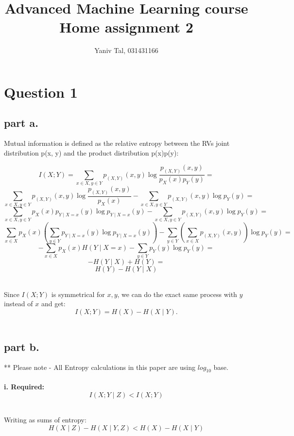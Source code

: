 \documentclass{article}
\title{{Advanced Machine Learning course}\break
{Home assignment 2}}
\author{Yaniv Tal, 031431166}
\begin{document}
\maketitle

\section{Question 1}
    \subsection {part a.}
        Mutual information is defined as the relative entropy between the RVs joint distribution p(x, y) and the product distribution p(x)p(y):
        
        \[ I(X;Y) = \sum_{x\in X,y\in {Y}}p_{(X,Y)}(x,y) \log {\frac {p_{(X,Y)}(x,y)}{p_{X}(x)p_{Y}(y)}} = \]
        \[ \sum_{x\in X, y\in Y} p_{(X,Y)}(x,y) \log {\frac {p_{(X,Y)}(x,y)}{p_{X}(x)}} - \sum _{x\in { {X}},y\in { Y}}p_{(X,Y)}(x,y)\log p_{Y}(y) = \]
        \[ \sum _{x\in { {X}},y\in { {Y}}}p_{X}(x)p_{Y\mid X=x}(y)\log p_{Y\mid X=x}(y) - \sum _{x\in { {X}},y\in { Y}}p_{(X,Y)}(x,y)\log p_{Y}(y) = \]
        \[ \sum _{x\in { {X}}}p_{X}(x)\left(\sum _{y\in { {Y}}}p_{Y\mid X=x}(y)\log p_{Y\mid X=x}(y)\right) - \sum _{y\in {Y}}\left(\sum _{x\in {X}}p_{(X,Y)}(x,y)\right)
        \log p_{Y}(y) = \]
        \[ -\sum _{x\in X}p_{X}(x) H(Y \mid X=x) - \sum _{y\in Y} p_{Y}(y) \log p_{Y}(y) = \]
        \[ -H (Y\mid X) + H(Y) = \] 
        \[ H (Y) - H (Y \mid X) \]
        
        \hfill \\
        Since $I(X;Y)$ is symmetrical for $x, y$, we can do the exact same process with $y$ instead of $x$ and get:
        \[ I(X;Y) = H(X) - H(X \mid Y). \]
        \hfill \\
    
    \break
    \subsection {part b.}
        ** Please note - All Entropy calculations in this paper are using $log_{10}$ base.
        \\
        \hfill \\
        \textbf{i. Required: }
        \[ I(X;Y \mid Z) < I(X;Y) \]

        \hfill \\
        Writing as sums of entropy:
        \[ H(X \mid Z) - H(X \mid Y, Z) < H(X) - H( X \mid Y) \]
\end{document}
